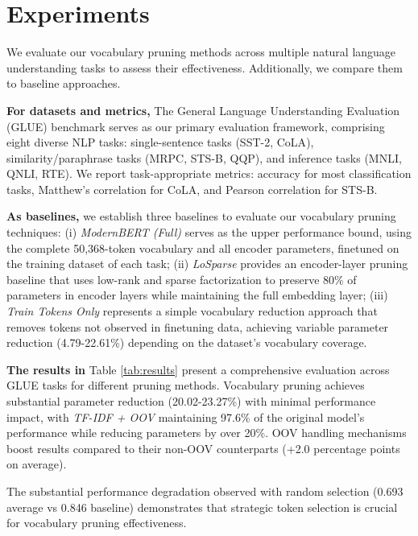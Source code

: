 \documentclass[twocolumn]{article}
\begin{document}
\section{Experiments}
We evaluate our vocabulary pruning methods across multiple natural language understanding tasks to assess their effectiveness. Additionally, we compare them to baseline approaches.

\textbf{For datasets and metrics,}
The General Language Understanding Evaluation (GLUE) benchmark\cite{wang2018glue} serves as our primary evaluation framework, comprising eight diverse NLP tasks: single-sentence tasks (SST-2\cite{socher2013recursive}, CoLA\cite{warstadt2019neural}), similarity/paraphrase tasks (MRPC\cite{dolan2005automatically}, STS-B\cite{cer2017semeval}, QQP\cite{qqp}), and inference tasks (MNLI\cite{williams2018broad}, QNLI\cite{rajpurkar2016squad}, RTE\cite{dagan2005pascal}). We report task-appropriate metrics: accuracy for most classification tasks, Matthew's correlation for CoLA, and Pearson correlation for STS-B. 


\textbf{As baselines,} 
we establish three baselines to evaluate our vocabulary pruning techniques: 
(i) \textit{ModernBERT (Full)} serves as the upper performance bound, using the complete 50,368-token vocabulary and all encoder parameters, finetuned on the training dataset of each task; 
(ii) \textit{LoSparse} provides an encoder-layer pruning baseline that uses low-rank and sparse factorization to preserve 80\% of parameters in encoder layers while maintaining the full embedding layer; 
(iii) \textit{Train Tokens Only} represents a simple vocabulary reduction approach that removes tokens not observed in finetuning data, achieving variable parameter reduction (4.79-22.61\%) depending on the dataset's vocabulary coverage.

\textbf{The results in}
Table \ref{tab:results} present a comprehensive evaluation across GLUE tasks for different pruning methods. 
% 
Vocabulary pruning achieves substantial parameter reduction (20.02-23.27\%) with minimal performance impact, with \textit{TF-IDF + OOV} maintaining 97.6\% of the original model's performance while reducing parameters by over 20\%. OOV handling mechanisms boost results compared to their non-OOV counterparts (+2.0 percentage points on average). 

The substantial performance degradation observed with random selection (0.693 average vs 0.846 baseline) demonstrates that strategic token selection is crucial for vocabulary pruning effectiveness.
\end{document}
